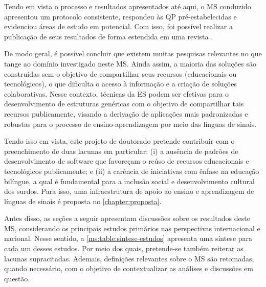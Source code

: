 Tendo em vista o processo e resultados apresentados até aqui, o MS conduzido apresentou um protocolo consistente, respondeu às QP pré-estabelecidas e evidenciou áreas de estudo em potencial. Com isso, foi possível realizar a publicação de seus resultados de forma estendida em uma revista \cite{FalvoJr2020_RENOTE}.

De modo geral, é possível concluir que existem muitas pesquisas relevantes no que tange ao domínio investigado neste MS. Ainda assim, a maioria das soluções são construídas sem o objetivo de compartilhar seus recursos (educacionais ou tecnológicos), o que dificulta o acesso à informação e a criação de soluções colaborativas. Nesse contexto, técnicas da ES podem ser efetivas para o desenvolvimento de estruturas genéricas com o objetivo de compartilhar tais recursos publicamente, visando a derivação de aplicações mais padronizadas e robustas para o processo de ensino-aprendizagem por meio das línguas de sinais. %


Tendo isso em vista, este projeto de doutorado pretende contribuir com o preenchimento de duas lacunas em particular: (i) a ausência de padrões de desenvolvimento de software que favoreçam o reúso de recursos educacionais e tecnológicos publicamente; e (ii) a carência de iniciativas com ênfase na educação bilíngue, a qual é fundamental para a inclusão social e desenvolvimento cultural dos surdos. Para isso, uma infraestrutura de apoio ao ensino e aprendizagem de línguas de sinais é proposta no \autoref{chapter:proposta}.

Antes disso, as seções a seguir apresentam discussões sobre os resultados deste MS, considerando os principais estudos primários nas perspectivas internacional e nacional. Nesse sentido, a \autoref{ms:table:sintese-estudos} apresenta uma síntese para cada um desses estudos. Por meio dos quais, pretende-se também reiterar as lacunas supracitadas. Ademais, definições relevantes sobre o MS são retomadas, quando necessário, com o objetivo de contextualizar as análises e discussões em questão.

